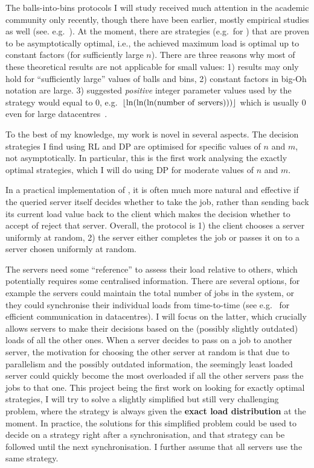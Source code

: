 The balls-into-bins protocols I will study received much attention in the academic community only recently, though there have been earlier, mostly empirical studies as well (see. e.g.~\cite{derek1986twothinningfirstattempt}). At the moment, there are strategies (e.g.\ for \TwoThinning) that are proven to be asymptotically optimal, i.e., the achieved maximum load is optimal up to constant factors (for sufficiently large $n$). There are three reasons why most of these theoretical results are not applicable for small values: 1) results may only hold for ``sufficiently large'' values of balls and bins, 2) constant factors in big-Oh notation are large. 3) suggested \textit{positive} integer parameter values used by the strategy would equal to $0$, e.g.\ $\floor{\ln(\ln(\ln(\mathrm{number\ of\ servers})))}$ which is usually $0$ even for large datacentres~\cite{uzaman2019datacentresize}.


To the best of my knowledge, my work is novel in several aspects. The decision strategies I find using RL and DP are optimised for specific values of $n$ and $m$, not asymptotically. In particular, this is the first work analysing the exactly optimal strategies, which I will do using DP for moderate values of $n$ and $m$.


In a practical implementation of \TwoThinning, it is often much more natural and effective if the queried server itself decides whether to take the job, rather than sending back its current load value back to the client which makes the decision whether to accept of reject that server. Overall, the protocol is 1) the client chooses a server uniformly at random, 2) the server either completes the job or passes it on to a server chosen uniformly at random.

The servers need some ``reference'' to assess their load relative to others, which potentially requires some centralised information. There are several options, for example the servers could maintain the total number of jobs in the system, or they could synchronise their individual loads from time-to-time (see e.g.~\cite{zhang2018datacenterloadbalancing} for efficient communication in datacentres). I will focus on the latter, which crucially allows servers to make their decisions based on the (possibly slightly outdated) loads of all the other ones. When a server decides to pass on a job to another server, the motivation for choosing the other server at random is that due to parallelism and the possibly outdated information, the seemingly least loaded server could quickly become the most overloaded if all the other servers pass the jobs to that one. This project being the first work on looking for exactly optimal strategies, I will try to solve a slightly simplified but still very challenging problem, where the strategy is always given the \textbf{exact load distribution} at the moment. In practice, the solutions for this simplified problem could be used to decide on a strategy right after a synchronisation, and that strategy can be followed until the next synchronisation. I further assume that all servers use the same strategy.


